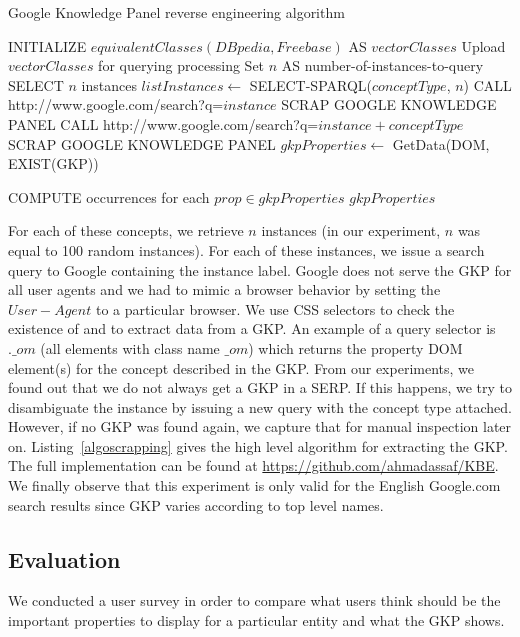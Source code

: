 \begin{algorithm}[h]\scriptsize
\caption{Google Knowledge Panel reverse engineering algorithm} \label{algoscrapping}
\begin{algorithmic}[1]
    \STATE INITIALIZE $equivalentClasses(DBpedia,Freebase) $ AS $vectorClasses$
    \STATE Upload $vectorClasses$ for querying processing
    \STATE Set $n$ AS number-of-instances-to-query
	\STATE SELECT $n$ instances
	\STATE $listInstances \leftarrow$ SELECT-SPARQL($conceptType$, $n$)
			\STATE CALL http://www.google.com/search?q=$instance$
				\STATE SCRAP GOOGLE KNOWLEDGE PANEL
			\ELSE
				\STATE CALL http://www.google.com/search?q=$instance + conceptType$
 				\STATE SCRAP GOOGLE KNOWLEDGE PANEL
			\ENDIF
			\STATE $gkpProperties \leftarrow$ GetData(DOM, EXIST(GKP))
			
		\ENDFOR
	\STATE COMPUTE occurrences for each $prop \in gkpProperties$
    \ENDFOR
    \RETURN $gkpProperties$
\end{algorithmic}
\end{algorithm}
\normalsize
For each of these concepts, we retrieve $n$ instances (in our experiment, $n$ was equal to 100 random instances). For each of these instances, we issue a search query to Google containing the instance label. Google does not serve the GKP for all user agents and we had to mimic a browser behavior by setting the $User-Agent$ to a particular browser. We use CSS selectors to check the existence of and to extract data from a GKP. An example of a query selector is $.\_om$ (all elements with class name $\_om$) which returns the property DOM element(s) for the concept described in the GKP. From our experiments, we found out that we do not always get a GKP in a SERP. If this happens, we try to disambiguate the instance by issuing a new query with the concept type attached. However, if no GKP was found again, we capture that for manual inspection later on. Listing~\ref{algoscrapping} gives the high level algorithm for extracting the GKP. The full implementation can be found at \url{https://github.com/ahmadassaf/KBE}. We finally observe that this experiment is only valid for the English Google.com search results since GKP varies according to top level names.


\subsection{Evaluation}
\label{sec:evaluation}
We conducted a user survey in order to compare what users think should be the important properties to display for a particular entity and what the GKP shows.

